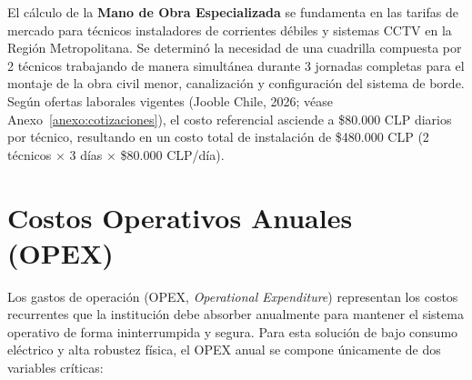 El cálculo de la \textbf{Mano de Obra Especializada} se fundamenta en las tarifas de mercado para técnicos instaladores de corrientes débiles y sistemas CCTV en la Región Metropolitana. Se determinó la necesidad de una cuadrilla compuesta por 2 técnicos trabajando de manera simultánea durante 3 jornadas completas para el montaje de la obra civil menor, canalización y configuración del sistema de borde. Según ofertas laborales vigentes (Jooble Chile, 2026; véase Anexo~\ref{anexo:cotizaciones}), el costo referencial asciende a \$80.000 CLP diarios por técnico, resultando en un costo total de instalación de \$480.000 CLP (2 técnicos $\times$ 3 días $\times$ \$80.000 CLP/día).

\section{Costos Operativos Anuales (OPEX)}
\label{sec:opex}

Los gastos de operación (OPEX, \textit{Operational Expenditure}) representan los costos recurrentes que la institución debe absorber anualmente para mantener el sistema operativo de forma ininterrumpida y segura. Para esta solución de bajo consumo eléctrico y alta robustez física, el OPEX anual se compone únicamente de dos variables críticas:

